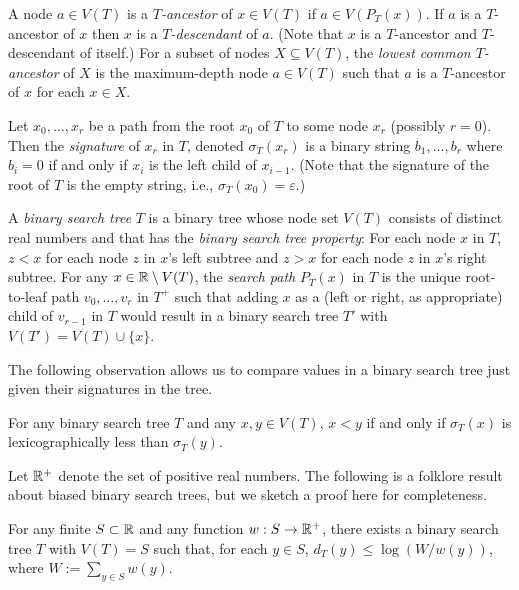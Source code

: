 \documentclass[kpfonts]{patmorin}
\let\le\leqslant
\begin{document}
A node $a\in V(T)$ is a \emph{$T$-ancestor} of $x\in V(T)$ if $a\in V(P_T(x))$. If $a$ is a $T$-ancestor of $x$ then $x$ is a \emph{$T$-descendant} of $a$. (Note that $x$ is a $T$-ancestor and $T$-descendant of itself.)  For a subset of nodes $X\subseteq V(T)$, the \emph{lowest common $T$-ancestor} of $X$ is the maximum-depth node $a\in V(T)$ such that $a$ is a $T$-ancestor of $x$ for each $x\in X$.  

Let $x_0,\ldots,x_{r}$ be a path from the root $x_0$ of $T$ to some node $x_r$ (possibly $r=0$).  Then the \emph{signature} of $x_r$ in $T$, denoted $\sigma_T(x_r)$ is a binary string $b_1,\ldots,b_r$ where $b_i=0$ if and only if $x_{i}$ is the left child of $x_{i-1}$.  (Note that the signature of the root of $T$ is the empty string, i.e., $\sigma_T(x_0)=\varepsilon$.)

A \emph{binary search tree} $T$ is a binary tree whose node set $V(T)$ consists of distinct real numbers and that has the \emph{binary search tree property}:  For each node $x$ in $T$, $z<x$ for each node $z$ in $x$'s left subtree and $z>x$ for each node $z$ in $x$'s right subtree. For any $x\in\mathbb{R}\setminus V(T)$, the \emph{search path} $P_T(x)$ in $T$ is the unique root-to-leaf path $v_0,\ldots,v_r$ in $T^+$ such that adding $x$ as a (left or right, as appropriate) child of $v_{r-1}$ in $T$ would result in a binary search tree $T'$ with $V(T')=V(T)\cup\{x\}$.

The following observation allows us to compare values in a binary search tree just given their signatures in the tree.

\begin{obs}
  For any binary search tree $T$ and any $x,y\in V(T)$, $x<y$ if and only if $\sigma_T(x)$ is lexicographically less than $\sigma_T(y)$.
\end{obs}

Let $\mathbb{R}^+$ denote the set of positive real numbers. The following is a folklore result about biased binary search trees, but we sketch a proof here for completeness.

\begin{lem}
  For any finite $S\subset \mathbb{R}$ and any function $w:S\to\mathbb{R}^+$, there exists a binary search tree $T$ with $V(T)=S$ such that, for each $y\in S$, $d_T(y)\le\log(W/w(y))$, where $W:=\sum_{y\in S} w(y)$.
\end{lem}
\end{document}

